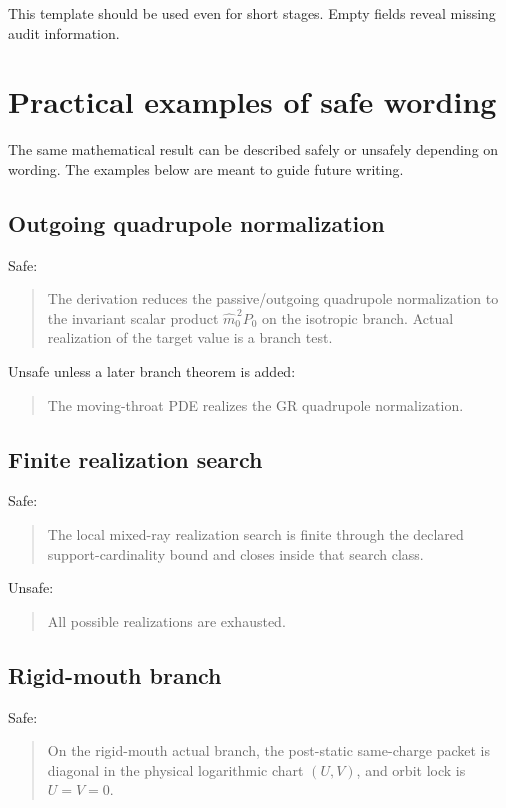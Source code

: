 This template should be used even for short stages.  Empty fields reveal missing audit information.

\section{Practical examples of safe wording}
\label{sec:safe-wording-examples}

The same mathematical result can be described safely or unsafely depending on wording.  The examples below are meant to guide future writing.

\subsection{Outgoing quadrupole normalization}
\label{subsec:safe-wording-outgoing}

Safe:
\begin{quote}
The derivation reduces the passive/outgoing quadrupole normalization to the invariant scalar product \(\widehat m_0^{\,2}P_0\) on the isotropic branch.  Actual realization of the target value is a branch test.
\end{quote}

Unsafe unless a later branch theorem is added:
\begin{quote}
The moving-throat PDE realizes the GR quadrupole normalization.
\end{quote}

\subsection{Finite realization search}
\label{subsec:safe-wording-realization-search}

Safe:
\begin{quote}
The local mixed-ray realization search is finite through the declared support-cardinality bound and closes inside that search class.
\end{quote}

Unsafe:
\begin{quote}
All possible realizations are exhausted.
\end{quote}

\subsection{Rigid-mouth branch}
\label{subsec:safe-wording-rigid-mouth}

Safe:
\begin{quote}
On the rigid-mouth actual branch, the post-static same-charge packet is diagonal in the physical logarithmic chart \((U,V)\), and orbit lock is \(U=V=0\).
\end{quote}

